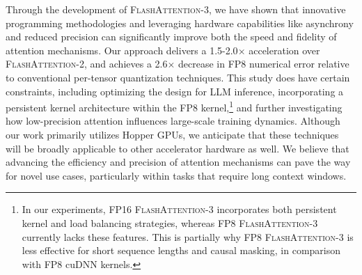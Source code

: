 Through the development of \textsc{FlashAttention-3}, we have shown that innovative programming methodologies and leveraging hardware capabilities like asynchrony and reduced precision can significantly improve both the speed and fidelity of attention mechanisms. Our approach delivers a 1.5-2.0$\times$ acceleration over \textsc{FlashAttention-2}, and achieves a 2.6$\times$ decrease in FP8 numerical error relative to conventional per-tensor quantization techniques. This study does have certain constraints, including optimizing the design for LLM inference, incorporating a persistent kernel architecture within the FP8 kernel,\footnote{In our experiments, FP16 \textsc{FlashAttention-3} incorporates both persistent kernel and load balancing strategies, whereas FP8 \textsc{FlashAttention-3} currently lacks these features. This is partially why FP8 \textsc{FlashAttention-3} is less effective for short sequence lengths and causal masking, in comparison with FP8 cuDNN kernels.} and further investigating how low-precision attention influences large-scale training dynamics. Although our work primarily utilizes Hopper GPUs, we anticipate that these techniques will be broadly applicable to other accelerator hardware as well. We believe that advancing the efficiency and precision of attention mechanisms can pave the way for novel use cases, particularly within tasks that require long context windows.

